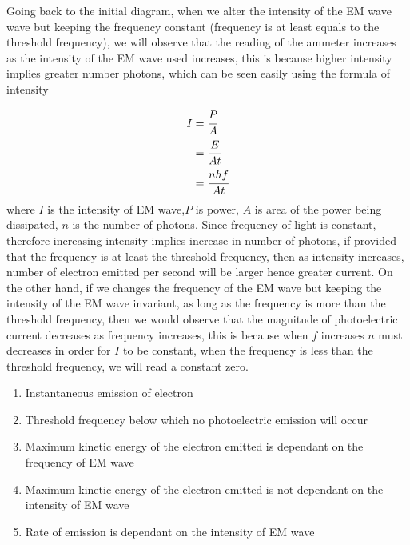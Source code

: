 \documentclass{article}
\begin{document}
 Going back to the initial diagram, when we alter the intensity of the EM wave wave but keeping the frequency constant (frequency is at least equals to the threshold frequency), we will observe that the reading of the ammeter increases as the intensity of the EM wave used increases, this is because higher intensity implies greater number photons, which can be seen easily using the formula of intensity 
 
\begin{align*}
     I&=\cfrac{P}{A} \\
      &=\cfrac{E}{At} \\ 
      &=\cfrac{nhf}{At}
\end{align*}
 where $I$ is the intensity of EM wave,$P$ is power, $A$ is area of the power being dissipated, $n$ is the number of photons. Since frequency of light is constant, therefore increasing intensity implies increase in number of photons, if provided that the frequency is at least the threshold frequency, then as intensity increases, number of electron emitted per second will be larger hence greater current. On the other hand, if we changes the frequency of the EM wave but keeping the intensity of the EM wave invariant, as long as the frequency is more than the threshold frequency, then we would observe that the magnitude of photoelectric current decreases as frequency increases, this is because when $f$ increases $n$ must decreases in order for $I$ to be constant, when the frequency is less than the threshold frequency, we will read a constant zero.
 
 \begin{tcolorbox}[colframe=black!20!white,title=\color{red}{Evidence provided by the observation of photoelectric emission}]
 \begin{enumerate}
 \color{red}
    \item Instantaneous emission of electron
     \item Threshold frequency below which no photoelectric emission will occur
     \item Maximum kinetic energy of the electron emitted is dependant on the frequency of EM wave
     \item Maximum kinetic energy of the electron emitted is not dependant on the intensity of EM wave
     \item Rate of emission is dependant on the intensity of EM wave
 \end{enumerate}
 \end{tcolorbox}
 
\end{document}
